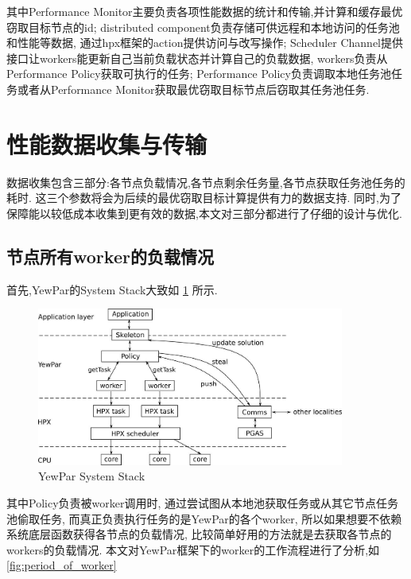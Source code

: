 \documentclass{mproj}
\begin{document}
其中Performance Monitor主要负责各项性能数据的统计和传输,并计算和缓存最优窃取目标节点的id;
distributed component负责存储可供远程和本地访问的任务池和性能等数据,
通过hpx框架的action提供访问与改写操作;
Scheduler Channel提供接口让workers能更新自己当前负载状态并计算自己的负载数据,
workers负责从Performance Policy获取可执行的任务;
Performance Policy负责调取本地任务池任务或者从Performance Monitor获取最优窃取目标节点后窃取其任务池任务.


\section{性能数据收集与传输}
数据收集包含三部分:各节点负载情况,各节点剩余任务量,各节点获取任务池任务的耗时.
这三个参数将会为后续的最优窃取目标计算提供有力的数据支持.
同时,为了保障能以较低成本收集到更有效的数据,本文对三部分都进行了仔细的设计与优化.

\subsection{节点所有worker的负载情况}
首先,YewPar的System Stack大致如
\cref{fig:yewpar_system_stack}
\cite{10.1007/978-3-030-29400-7_14}
所示.

\begin{figure}[h] %
    \centering %
    \includegraphics[width=0.9\textwidth]{images/YewPar_System_Stack.jpg} %
    \caption{YewPar System Stack} %
    \label{fig:yewpar_system_stack} %
\end{figure}
\FloatBarrier

其中Policy负责被worker调用时,
通过尝试图从本地池获取任务或从其它节点任务池偷取任务,
而真正负责执行任务的是YewPar的各个worker,
所以如果想要不依赖系统底层函数获得各节点的负载情况,
比较简单好用的方法就是去获取各节点的workers的负载情况.
本文对YewPar框架下的worker的工作流程进行了分析,如\cref{fig:period_of_worker}
\end{document}
